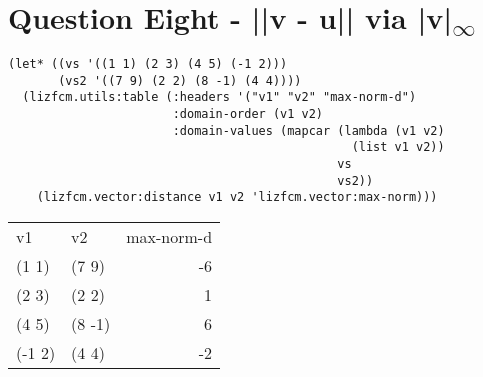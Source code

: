 \documentclass[11pt]{article}
\begin{document}
\section{Question Eight - ||v - u|| via |v|\textsubscript{\(\infty\)}}
\label{sec:org2661676}
\begin{verbatim}
(let* ((vs '((1 1) (2 3) (4 5) (-1 2)))
       (vs2 '((7 9) (2 2) (8 -1) (4 4))))
  (lizfcm.utils:table (:headers '("v1" "v2" "max-norm-d")
                       :domain-order (v1 v2)
                       :domain-values (mapcar (lambda (v1 v2)
                                                (list v1 v2))
                                              vs
                                              vs2))
    (lizfcm.vector:distance v1 v2 'lizfcm.vector:max-norm)))
\end{verbatim}

\begin{center}
\begin{tabular}{llr}
v1 & v2 & max-norm-d\\[0pt]
(1 1) & (7 9) & -6\\[0pt]
(2 3) & (2 2) & 1\\[0pt]
(4 5) & (8 -1) & 6\\[0pt]
(-1 2) & (4 4) & -2\\[0pt]
\end{tabular}
\end{center}
\end{document}
